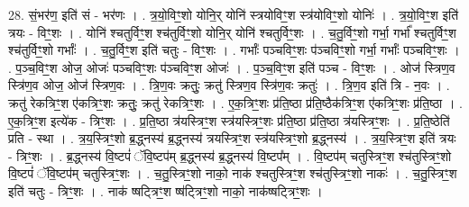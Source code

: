 \documentclass[17pt]{extarticle}
\begin{document}
28. सं॒भर॑ण॒ इति॑ सं - भर॑णः । . त्र॒यो॒विꣳ॒॒शो योनि॒र् योनि॑ स्त्रयोविꣳ॒॒श स्त्र॑योविꣳ॒॒शो योनिः॑ । . त्र॒यो॒विꣳ॒॒श इति॑ त्रयः - विꣳ॒॒शः । . योनि॑ श्चतुर्विꣳ॒॒श श्च॑तुर्विꣳ॒॒शो योनि॒र् योनि॑ श्चतुर्विꣳ॒॒शः । . च॒तु॒र्विꣳ॒॒शो गर्भा॒ गर्भा᳚ श्चतुर्विꣳ॒॒श श्च॑तुर्विꣳ॒॒शो गर्भाः᳚ । . च॒तु॒र्विꣳ॒॒श इति॑ चतुः - विꣳ॒॒शः । . गर्भाः᳚ पञ्चविꣳ॒॒शः प॑ञ्चविꣳ॒॒शो गर्भा॒ गर्भाः᳚ पञ्चविꣳ॒॒शः । . प॒ञ्च॒विꣳ॒॒श ओज॒ ओजः॑ पञ्चविꣳ॒॒शः प॑ञ्चविꣳ॒॒श ओजः॑ । . प॒ञ्च॒विꣳ॒॒श इति॑ पञ्च - विꣳ॒॒शः । . ओज॑ स्त्रिण॒व स्त्रि॑ण॒व ओज॒ ओज॑ स्त्रिण॒वः । . त्रि॒ण॒वः क्रतुः॒ क्रतु॑ स्त्रिण॒व स्त्रि॑ण॒वः क्रतुः॑ । . त्रि॒ण॒व इति॑ त्रि - न॒वः । . क्रतु॑ रेकत्रिꣳ॒॒श ए॑कत्रिꣳ॒॒शः क्रतुः॒ क्रतु॑ रेकत्रिꣳ॒॒शः । . ए॒क॒त्रिꣳ॒॒शः प्र॑ति॒ष्ठा प्र॑ति॒ष्ठैक॑त्रिꣳ॒॒श ए॑कत्रिꣳ॒॒शः प्र॑ति॒ष्ठा । . ए॒क॒त्रिꣳ॒॒श इत्ये॑क - त्रिꣳ॒॒शः । . प्र॒ति॒ष्ठा त्र॑यस्त्रिꣳ॒॒श स्त्र॑यस्त्रिꣳ॒॒शः प्र॑ति॒ष्ठा प्र॑ति॒ष्ठा त्र॑यस्त्रिꣳ॒॒शः । . प्र॒ति॒ष्ठेति॑ प्रति - स्था । . त्र॒य॒स्त्रिꣳ॒॒शो ब्र॒द्ध्नस्य॑ ब्र॒द्ध्नस्य॑ त्रयस्त्रिꣳ॒॒श स्त्र॑यस्त्रिꣳ॒॒शो ब्र॒द्ध्नस्य॑ । . त्र॒य॒स्त्रिꣳ॒॒श इति॑ त्रयः - त्रिꣳ॒॒शः । . ब्र॒द्ध्नस्य॑ वि॒ष्टपं॑ ॅवि॒ष्टप॑म् ब्र॒द्ध्नस्य॑ ब्र॒द्ध्नस्य॑ वि॒ष्टप᳚म् । . वि॒ष्टप॑म् चतुस्त्रिꣳ॒॒श श्च॑तुस्त्रिꣳ॒॒शो वि॒ष्टपं॑ ॅवि॒ष्टप॑म् चतुस्त्रिꣳ॒॒शः । . च॒तु॒स्त्रिꣳ॒॒शो नाको॒ नाक॑ श्चतुस्त्रिꣳ॒॒श श्च॑तुस्त्रिꣳ॒॒शो नाकः॑ । . च॒तु॒स्त्रिꣳ॒॒श इति॑ चतुः - त्रिꣳ॒॒शः । . नाक॑ ष्षट्त्रिꣳ॒॒श ष्ष॑ट्त्रिꣳ॒॒शो नाको॒ नाक॑ष्षट्त्रिꣳ॒॒शः । \newline
\end{document}
